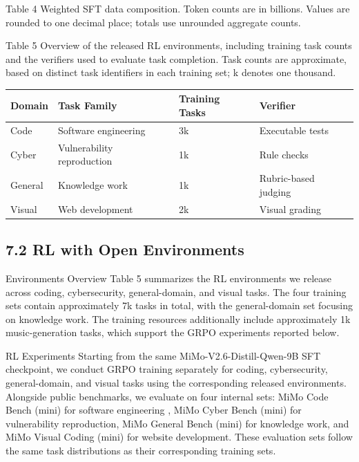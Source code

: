 \documentclass[
  10
]{article}
\newcounter{none} %
\begin{document}
Table 4 Weighted SFT data composition. Token counts are in billions.
Values are rounded to one decimal place; totals use unrounded aggregate
counts.

Table 5 Overview of the released RL environments, including training
task counts and the verifiers used to evaluate task completion. Task
counts are approximate, based on distinct task identifiers in each
training set; k denotes one thousand.

{\def\LTcaptype{none} %
\begin{longtable}[]{@{}|l|l|l|l|@{}}
\toprule\noalign{}
\endhead
\bottomrule\noalign{}
\endlastfoot
\hline
Domain & Task Family & Training Tasks & Verifier \\
\hline
Code & Software engineering & 3k & Executable tests \\
\hline
Cyber & Vulnerability reproduction & 1k & Rule checks \\
\hline
General & Knowledge work & 1k & Rubric-based judging \\
\hline
Visual & Web development & 2k & Visual grading \\
\hline
\end{longtable}
}

\subsection{7.2 RL with Open
Environments}\label{rl-with-open-environments}

Environments Overview Table 5 summarizes the RL environments we release
across coding, cybersecurity, general-domain, and visual tasks. The four
training sets contain approximately 7k tasks in total, with the
general-domain set focusing on knowledge work. The training resources
additionally include approximately 1k music-generation tasks, which
support the GRPO experiments reported below.

RL Experiments Starting from the same MiMo-V2.6-Distill-Qwen-9B SFT
checkpoint, we conduct GRPO training separately for coding,
cybersecurity, general-domain, and visual tasks using the corresponding
released environments. Alongside public benchmarks, we evaluate on four
internal sets: MiMo Code Bench (mini) for software engineering , MiMo
Cyber Bench (mini) for vulnerability reproduction, MiMo General Bench
(mini) for knowledge work, and MiMo Visual Coding (mini) for website
development. These evaluation sets follow the same task distributions as
their corresponding training sets.
\end{document}
